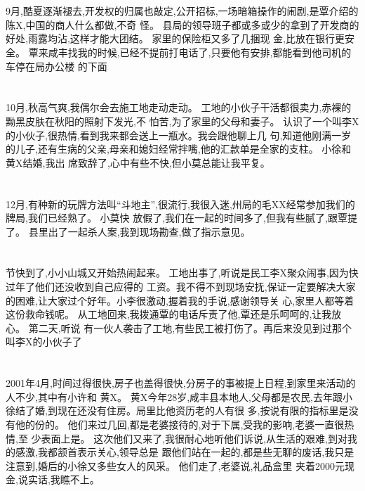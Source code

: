 \documentclass[11pt]{article}
\begin{document}
\section{}
9月,酷夏逐渐褪去,开发权的归属也敲定,公开招标,一场暗箱操作的闹剧,是覃介绍的陈X,中国的商人什么都做,不奇
怪。 县局的领导班子都或多或少的拿到了开发商的好处,雨露均沾,这样才能大团结。 家里的保险柜又多了几捆现
金,比放在银行更安全。 覃来咸丰找我的时候,已经不提前打电话了,只要他有安排,都能看到他司机的车停在局办公楼
的下面

\section{}
10月,秋高气爽,我偶尔会去施工地走动走动。 工地的小伙子干活都很卖力,赤裸的黝黑皮肤在秋阳的照射下发光,不
怕苦,为了家里的父母和妻子。 认识了一个叫李X的小伙子,很热情,看到我来都会送上一瓶水。我会跟他聊上几
句,知道他刚满一岁的儿子,还有生病的父亲,母亲和媳妇经常拌嘴,他的汇款单是全家的支柱。 小徐和黄X结婚,我出
席致辞了,心中有些不快,但小莫总能让我平复。

\section{}
12月,有种新的玩牌方法叫``斗地主'',很流行,我很入迷,州局的毛XX经常参加我们的牌局,我们已经熟了。 小莫快
放假了,我们在一起的时间多了,但我有些腻了,跟覃提了。 县里出了一起杀人案,我到现场勘查,做了指示意见。

\section{}
节快到了,小小山城又开始热闹起来。 工地出事了,听说是民工李X聚众闹事,因为快过年了他们还没收到自己应得的
工资。我不得不到现场安抚,保证一定要解决大家的困难,让大家过个好年。小李很激动,握着我的手说,感谢领导关
心,家里人都等着这份救命钱呢。 从工地回来,我拨通覃的电话斥责了他,覃还是乐呵呵的,让我放心。 第二天,听说
有一伙人袭击了工地,有些民工被打伤了。再后来没见到过那个叫李X的小伙子了

\section{}
2001年4月,时间过得很快,房子也盖得很快,分房子的事被提上日程,到家里来活动的人不少,其中有小许和
黄X。 黄X今年28岁,咸丰县本地人,父母都是农民,去年跟小徐结了婚,到现在还没有住房。局里比他资历老的人有很
多,按说有限的指标里是没有他的份的。 他们来过几回,都是老婆接待的,对于下属,受我的影响,老婆一直很热情,至
少表面上是。 这次他们又来了,我很耐心地听他们诉说,从生活的艰难,到对我的感激,我都颔首表示关心,领导总是
跟他们站在一起的,都是些无聊的废话,我只是注意到,婚后的小徐又多些女人的风采。 他们走了,老婆说,礼品盒里
夹着2000元现金,说实话,我瞧不上。
\end{document}

